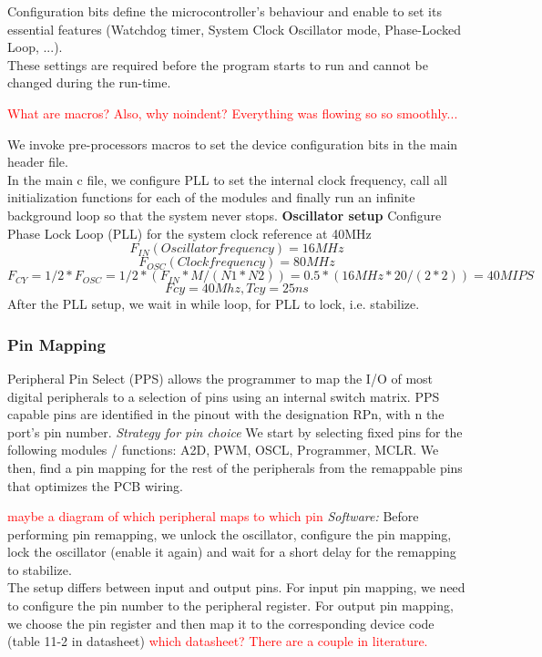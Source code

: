 Configuration bits define the microcontroller’s behaviour and enable to set its essential features (Watchdog timer, System Clock Oscillator mode, Phase-Locked Loop, ...).\\
These settings are required before the program starts to run and cannot be changed during the run-time.\\
\vskip 0.1in
\noindent

\textcolor{red}{What are macros? Also, why noindent? Everything was flowing so so smoothly...}

We invoke pre-processors macros to set the device configuration bits in the main header file.\\
In the main c file, we configure PLL to set the internal clock frequency, call all initialization functions for each of the modules and finally run an infinite background loop so that the system never stops.
\vskip 0.2in
\noindent
\textbf{Oscillator setup}
\vskip 0.1in
\noindent
Configure Phase Lock Loop (PLL) for the system clock reference at 40MHz
	$$F_{IN} (Oscillator frequency) = 16MHz  $$
    $$F_{OSC} (Clock frequency) =  80MHz$$
 	$$F_{CY} = 1/2 * F_{OSC} = 1/2 * (F_{IN}*M/(N1*N2)) = 0.5 * (16MHz*20/(2*2)) = 40 MIPS$$
$$Fcy=40Mhz, Tcy=25ns$$
After the PLL setup, we wait in while loop, for PLL to lock, i.e. stabilize.

\subsubsection*{Pin Mapping}

Peripheral Pin Select (PPS) allows the programmer to map the I/O of most digital peripherals to a selection of pins using an internal switch matrix.
PPS capable pins are identified in the pinout with the designation RPn, with n the port’s pin number.
\vskip 0.2in
\noindent
\textit{Strategy for pin choice}
\vskip 0.1in
\noindent
We start by selecting fixed pins for the following modules / functions: A2D, PWM, OSCL, Programmer, MCLR. We then, find a pin mapping for the rest of the peripherals from the remappable pins that optimizes the PCB wiring.

\textcolor{red}{
maybe a diagram of which peripheral maps to which pin
}
\vskip 0.2in
\noindent
\textit{Software:}
\vskip 0.1in
\noindent
Before performing pin remapping, we unlock the oscillator, configure the pin mapping, lock the oscillator (enable it again) and wait for a short delay for the remapping to stabilize.\\
The setup differs between input and output pins. For input pin mapping, we need to configure the pin number to the peripheral register. For output pin mapping, we choose the pin register and then map it to the corresponding device code (table 11-2 in datasheet)
\textcolor{red}{which datasheet? There are a couple in literature.}

